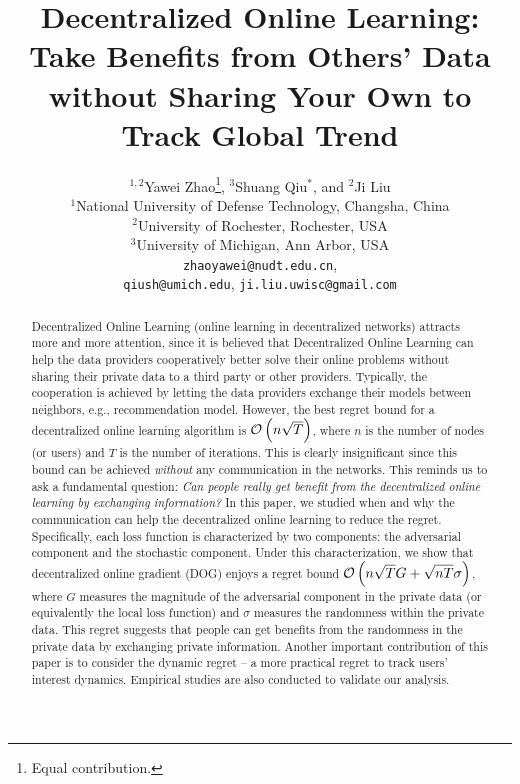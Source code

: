 \documentclass{article}
\title{Decentralized Online Learning: Take Benefits from Others' Data without Sharing Your Own to Track Global Trend}
\author{
  $^{1,2}$Yawei Zhao\footnote{Equal contribution.}, $^3$Shuang Qiu$^\ast$, and $^{2}$Ji Liu \\
  $^1$National University of Defense Technology, Changsha, China\\
  $^2$University of Rochester, Rochester, USA \\
  $^3$University of Michigan, Ann Arbor, USA \\
  \texttt{zhaoyawei@nudt.edu.cn}, \\
  \texttt{qiush@umich.edu}, \texttt{ji.liu.uwisc@gmail.com} \\
}
\begin{document}
\maketitle

\begin{abstract}
Decentralized Online Learning (online learning in decentralized networks) attracts more and more attention, since it is believed that Decentralized Online Learning can help the data providers cooperatively better solve their online problems without sharing their private data to a third party or other providers.
Typically, the cooperation is achieved by letting the data providers exchange their models between neighbors, e.g., recommendation model. However, the best regret bound for a decentralized online learning algorithm is ${\mathcal{O}\left( n\sqrt{T} \right)}$, where $n$ is the number of nodes (or users) and $T$ is the number of iterations. This is clearly insignificant since this bound can be achieved \emph{without} any communication in the networks. This reminds us to ask a fundamental question: \emph{Can people really get benefit from the decentralized online learning by exchanging information?}
In this paper, we studied when and why the communication can help the decentralized online learning to reduce the regret.
Specifically, each loss function is characterized by two components: the adversarial component and the stochastic component.
Under this characterization, we show that decentralized online gradient (DOG) enjoys a regret bound  ${\mathcal{O}\left( n\sqrt{T}G + \sqrt{nT}\sigma \right)}$, where $G$ measures the magnitude of the adversarial component in the private data (or equivalently the local loss function) and $\sigma$ measures the randomness within the private data. This regret suggests that people can get benefits from the randomness in the private data by exchanging private information. Another important contribution of this paper is to consider the dynamic regret -- a more practical regret to track users' interest dynamics. Empirical studies are also conducted to validate our analysis. 
\end{abstract}
\end{document}
